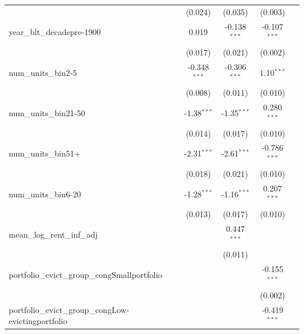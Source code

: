 \begin{tabular}{lcccc}
                                                               & (0.024)        & (0.035)        & (0.003)        &   \\   
   year\_blt\_decadepre-1900                                   & 0.019          & -0.138$^{***}$ & -0.107$^{***}$ &   \\   
                                                               & (0.017)        & (0.021)        & (0.002)        &   \\   
   num\_units\_bin2-5                                          & -0.348$^{***}$ & -0.306$^{***}$ & 1.10$^{***}$   &   \\   
                                                               & (0.008)        & (0.011)        & (0.010)        &   \\   
   num\_units\_bin21-50                                        & -1.38$^{***}$  & -1.35$^{***}$  & 0.280$^{***}$  &   \\   
                                                               & (0.014)        & (0.017)        & (0.010)        &   \\   
   num\_units\_bin51+                                          & -2.31$^{***}$  & -2.61$^{***}$  & -0.786$^{***}$ &   \\   
                                                               & (0.018)        & (0.021)        & (0.010)        &   \\   
   num\_units\_bin6-20                                         & -1.28$^{***}$  & -1.16$^{***}$  & 0.207$^{***}$  &   \\   
                                                               & (0.013)        & (0.017)        & (0.010)        &   \\   
   mean\_log\_rent\_inf\_adj                                   &                & 0.447$^{***}$  &                &   \\   
                                                               &                & (0.011)        &                &   \\   
   portfolio\_evict\_group\_congSmallportfolio                 &                &                & -0.155$^{***}$ &   \\   
                                                               &                &                & (0.002)        &   \\   
   portfolio\_evict\_group\_congLow-evictingportfolio          &                &                & -0.419$^{***}$ &   \\   

\end{tabular}
